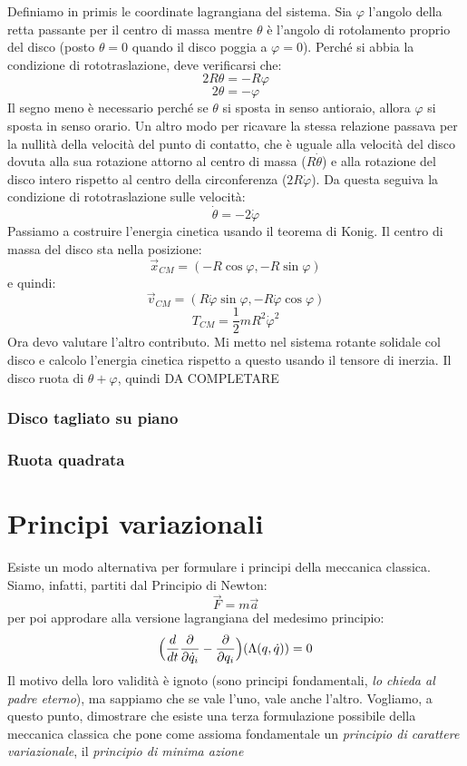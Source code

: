 \documentclass[a4paper,openany]{article}
\begin{document}
	Definiamo in primis le coordinate lagrangiana del sistema. Sia $\varphi$ l'angolo della retta passante per il centro di massa mentre $\theta$ è l'angolo di rotolamento proprio del disco (posto $\theta = 0$ quando il disco poggia a $\varphi = 0$). Perché si abbia la condizione di rototraslazione, deve verificarsi che:
	$$
	2R\theta = -R\varphi
	$$
	$$
	2\theta = -\varphi
	$$
	Il segno meno è necessario perché se $\theta$ si sposta in senso antioraio, allora $\varphi$ si sposta in senso orario. Un altro modo per ricavare la stessa relazione passava per la nullità della velocità del punto di contatto, che è uguale alla velocità del disco dovuta alla sua rotazione attorno al centro di massa ($R\dot{\theta}$) e alla rotazione del disco intero rispetto al centro della circonferenza ($2R\dot{\varphi}$). Da questa seguiva la condizione di rototraslazione sulle velocità:
	$$
	\dot{\theta} = -2\dot{\varphi}
	$$
	Passiamo a costruire l'energia cinetica usando il teorema di Konig. Il centro di massa del disco sta nella posizione:
	$$
	\vec{x}_{CM}= (-R\cos\varphi, -R\sin\varphi)
	$$
	e quindi:
	$$
	\vec{v}_{CM} = (R\dot{\varphi}\sin\varphi, -R\dot{\varphi}\cos\varphi)
	$$
	$$
	T_{CM} = \dfrac{1}{2}mR^{2}\dot{\varphi}^{2}
	$$
	Ora devo valutare l'altro contributo. Mi metto nel sistema rotante solidale col disco e calcolo l'energia cinetica rispetto a questo usando il tensore di inerzia. Il disco ruota di $\theta+\varphi$, quindi
	DA COMPLETARE 
	\subsubsection{Disco tagliato su piano}
	\subsubsection{Ruota quadrata}
	
	\newpage
	
	
	\section{Principi variazionali}
	Esiste un modo alternativa per formulare i principi della meccanica classica. Siamo, infatti, partiti dal Principio di Newton:
	$$\vec{F} = m\vec{a}$$
	per poi approdare alla versione lagrangiana del medesimo principio:
	\begin{equation}\label{key}
		\Bigl(\dfrac{d}{dt}\dfrac{\partial}{\partial \dot{q}_i}-\dfrac{\partial}{\partial q_i}\Bigl)(\Lambda(q,\dot{q})) = 0
	\end{equation}
	Il motivo della loro validità è ignoto (sono principi fondamentali, \textit{lo chieda al padre eterno}), ma sappiamo che se vale l'uno, vale anche l'altro. Vogliamo, a questo punto, dimostrare che esiste una terza formulazione possibile della meccanica classica che pone come assioma fondamentale un \textit{principio di carattere variazionale}, il \textit{principio di minima azione}
\end{document}
